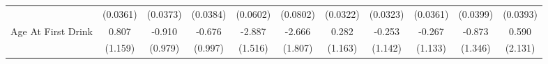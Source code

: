 {\begin{tabular}{l*{10}{c}}
            &    (0.0361)         &    (0.0373)         &    (0.0384)         &    (0.0602)         &    (0.0802)         &    (0.0322)         &    (0.0323)         &    (0.0361)         &    (0.0399)         &    (0.0393)         \\
\addlinespace
Age At First Drink&       0.807         &      -0.910         &      -0.676         &      -2.887         &      -2.666         &       0.282         &      -0.253         &      -0.267         &      -0.873         &       0.590         \\
            &     (1.159)         &     (0.979)         &     (0.997)         &     (1.516)         &     (1.807)         &     (1.163)         &     (1.142)         &     (1.133)         &     (1.346)         &     (2.131)         \\
\bottomrule
\end{tabular}
}
